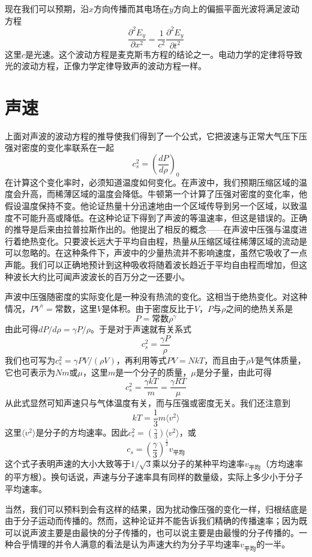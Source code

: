 现在我们可以预期，沿$x$方向传播而其电场在$y$方向上的偏振平面光波将满足波动方程
\begin{equation}
    \label{Eq:I:47:20}
    \frac{\partial^2E_y}{\partial x^2} = \frac{1}{c^2}\frac{\partial^2E_y}{\partial t^2}
\end{equation}
这里$c$是光速。这个波动方程是麦克斯韦方程的结论之一。电动力学的定律将导致光的波动方程，正像力学定律导致声的波动方程一样。

\section{声速}

上面对声波的波动方程的推导使我们得到了一个公式，它把波速与正常大气压下压强对密度的变化率联系在一起
\begin{equation}
    \label{Eq:I:47:21}
    c_s^2 = \left(\frac{dP}{d\rho}\right)_0
\end{equation}
在计算这个变化率时，必须知道温度如何变化。在声波中，我们预期压缩区域的温度会升高，而稀薄区域的温度会降低。牛顿第一个计算了压强对密度的变化率，他假设温度保持不变。他论证热量十分迅速地由一个区域传导到另一个区域，以致温度不可能升高或降低。在这种论证下得到了声波的等温速率，但这是错误的。正确的推导是后来由拉普拉斯作出的。他提出了相反的概念——在声波中压强与温度进行着绝热变化。只要波长远大于平均自由程，热量从压缩区域往稀薄区域的流动是可以忽略的。在这种条件下，声波中的少量热流并不影响速度，虽然它吸收了一点声能。我们可以正确地预计到这种吸收将随着波长趋近于平均自由程而增加，但这种波长大约比可闻声波波长的百万分之一还要小。

声波中压强随密度的实际变化是一种没有热流的变化。这相当于绝热变化。对这种情况，$PV^{\gamma}=\text{常数}$，这里$V$是体积。由于密度反比于$V$，$P$与$\rho$之间的绝热关系是
\begin{equation}
    \label{Eq:I:47:22}
    P=\text{常数}\rho^\gamma
\end{equation}
由此可得$dP /d\rho = \gamma P /\rho$。于是对于声速就有关系式
\begin{equation}
    \label{Eq:I:47:23}
    c_s^2 = \frac{\gamma P}{\rho}
\end{equation}
我们也可写为$c_s^2 = \gamma PV/(\rho V)$，再利用等式$PV=NkT$，而且由于$\rho V$是气体质量，它也可表示为$Nm$或$\mu$，这里$m$是一个分子的质量，$\mu$是分子量，由此可得
\begin{equation}
    \label{Eq:I:47:24}
    c_s^2 = \frac{\gamma kT}{m} = \frac{\gamma RT}{\mu}
\end{equation}
从此式显然可知声速只与气体温度有关，而与压强或密度无关。我们还注意到
\begin{equation}
    \label{Eq:I:47:25}
    kT = \frac{1}{3}m\langle v^2 \rangle
\end{equation}
这里$\langle v^2 \rangle$是分子的方均速率。因此$c_s^2=\left(\frac{\gamma}{3}\right)\langle v^2 \rangle$，或
\begin{equation}
    \label{Eq:I:47:26}
    c_s = \left(\frac{\gamma}{3}\right)^{\frac{1}{2}} v_\text{平均}
\end{equation}
这个式子表明声速的大小大致等于$1/\sqrt{3}$乘以分子的某种平均速率$v_\text{平均}$（方均速率的平方根）。换句话说，声速与分子速率具有同样的数量级，实际上多少小于分子平均速率。

当然，我们可以预料到会有这样的结果，因为扰动像压强的变化一样，归根结底是由于分子运动而传播的。然而，这种论证并不能告诉我们精确的传播速率；因为既可以说声波主要是由最快的分子传播的，也可以说主要是由最慢的分子传播的。一种合乎情理的并令人满意的看法是认为声速大约为分子平均速率$v_\text{平均}$的一半。